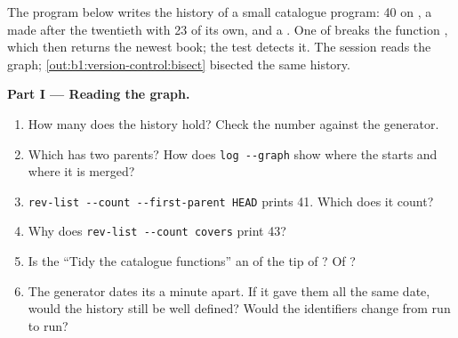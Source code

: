 \begin{problem}\label{pb:b1:version-control:1}
The program below writes the history of a small catalogue program: 40  on , a  
made after the twentieth with 23  of its own, and a . One  of  breaks the function
, which then returns the newest book; the test  detects it. The session reads the graph;
\cref{out:b1:version-control:bisect} bisected the same history.
\label{lst:b1:version-control:make-history}
\label{out:b1:version-control:problem}

\medskip\noindent\textbf{Part I --- Reading the graph.}
\begin{enumerate}
\item How many  does the history hold? Check the number against the generator.
\item Which  has two parents? How does \texttt{log -{}-{}graph} show where the  starts and where it is merged?
\item \texttt{rev-{}list -{}-{}count -{}-{}first-{}parent HEAD} prints 41. Which  does it count?
\item Why does \texttt{rev-{}list -{}-{}count covers} print 43?
\item Is the  ``Tidy the catalogue functions'' an  of the tip of ? Of ?
\item The generator dates its  a minute apart. If it gave them all the same date, would the history still be
well defined? Would the identifiers change from run to run?
\end{enumerate}


\end{problem}
